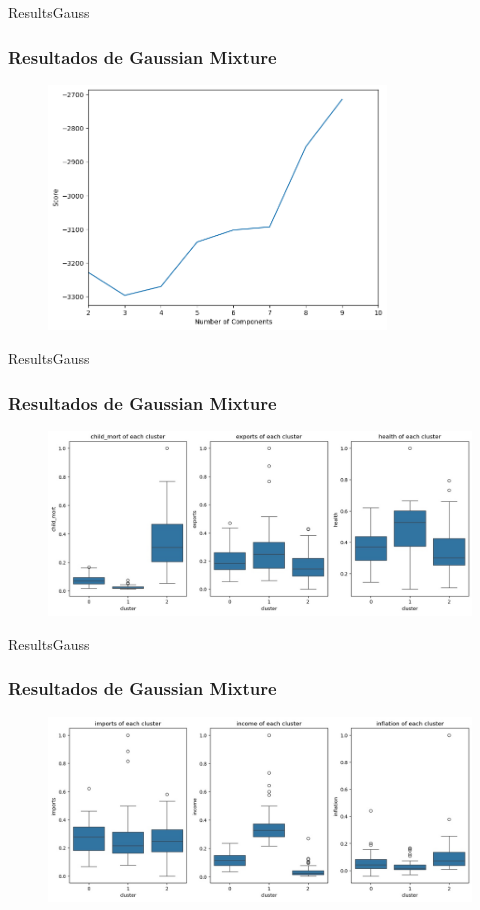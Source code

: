 \documentclass{beamer}
\begin{document}
\begin{frame}{ResultsGauss}
  \frametitle{Resultados de Gaussian Mixture}
  \begin{figure}
    \includegraphics[width=0.8\textwidth]{../images/gaussian/bic.png}
  \end{figure}
\end{frame}

\begin{frame}{ResultsGauss}
  \frametitle{Resultados de Gaussian Mixture}
  \begin{figure}
    \includegraphics[width=\textwidth]{../images/gaussian/features-dist-1.jpg}
  \end{figure}
\end{frame}

\begin{frame}{ResultsGauss}
  \frametitle{Resultados de Gaussian Mixture}
  \begin{figure}
    \includegraphics[width=\textwidth]{../images/gaussian/features-dist-2.jpg}
  \end{figure}
\end{frame}
\end{document}

